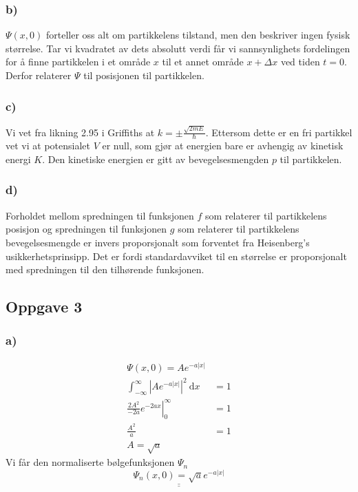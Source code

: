 \documentclass{article}
\begin{document}
\subsubsection*{b)}
$Ψ(x,0)$ forteller oss alt om partikkelens tilstand, men den beskriver ingen fysisk størrelse. Tar vi kvadratet av dets absolutt verdi får vi sannsynlighets fordelingen for å finne partikkelen i et område $x$ til et annet område $x + Δx$ ved tiden $t=0$. Derfor relaterer $Ψ$ til posisjonen til partikkelen.

\subsubsection*{c)}
Vi vet fra likning 2.95 i Griffiths at $k = ± \frac{\sqrt{2mE}}{ℏ}$. Ettersom dette er en fri partikkel vet vi at potensialet $V$ er null, som gjør at energien bare er avhengig av kinetisk energi $K$. Den kinetiske energien er gitt av bevegelsesmengden $p$ til partikkelen. 

\subsubsection*{d)}
Forholdet mellom spredningen til funksjonen $f$ som relaterer til partikkelens posisjon og spredningen til funksjonen $g$ som relaterer til partikkelens bevegelsesmengde er invers proporsjonalt som forventet fra Heisenberg's usikkerhetsprinsipp. Det er fordi standardavviket til en størrelse er proporsjonalt med spredningen til den tilhørende funksjonen.

\subsection*{Oppgave 3}
\subsubsection*{a)}
\begin{align*}
    Ψ(x,0) = Ae^{-a\left|x\right|}\\
    ∫_{-∞}^{∞} \left|Ae^{-a\left|x\right|}\right|^2 \ \mathrm{d}x &= 1\\
    \left.\frac{2A^2}{-2a}e^{-2ax}\right\rvert_{0}^{∞} &= 1\\
    \frac{A^2}{a} &= 1\\
    A = \sqrt{a}  
\end{align*}
Vi får den normaliserte bølgefunksjonen $Ψ_n$
\[
\underline{\underline{Ψ_n(x,0) = \sqrt{a} e^{-a\left|x\right|}}}
\]
\end{document}
